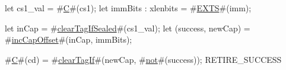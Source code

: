 let cs1_val = #\hyperref[sailRISCVzC]{C}#(cs1);
let immBits : xlenbits = #\hyperref[sailRISCVzEXTS]{EXTS}#(imm);

let inCap = #\hyperref[sailRISCVzclearTagIfSealed]{clearTagIfSealed}#(cs1_val);
let (success, newCap) = #\hyperref[sailRISCVzincCapOffset]{incCapOffset}#(inCap, immBits);

#\hyperref[sailRISCVzC]{C}#(cd) = #\hyperref[sailRISCVzclearTagIf]{clearTagIf}#(newCap, #\hyperref[sailRISCVznot]{not}#(success));
RETIRE_SUCCESS
